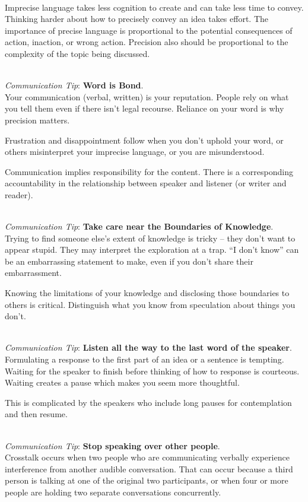 \ \\
Imprecise language takes less cognition to create and can take less time to convey. Thinking harder about how to precisely convey an idea takes effort. 
The importance of precise language is proportional to the potential consequences of action, inaction, or wrong action.
Precision also should be proportional to the complexity of the topic being discussed. 

\ \\
\textit{Communication Tip}: \textbf{Word is Bond\label{sec:word-is-bond}}.\\
Your communication (verbal, written) is your reputation. People rely on what you tell them even if there isn't legal recourse. Reliance on your word is why precision matters. 

Frustration and disappointment follow when you don't uphold your word, or others misinterpret your imprecise language, or you are misunderstood.

Communication implies responsibility for the content.  There is a corresponding accountability in the relationship between speaker and listener (or writer and reader).

\ \\
\textit{Communication Tip}: \textbf{Take care near the Boundaries of Knowledge}.\\
Trying to find someone else's extent of knowledge is tricky -- they don't want to appear stupid. They may interpret the exploration at a trap. ``I don't know'' can be an embarrassing statement to make, even if you don't share their embarrassment. 

Knowing the limitations of your knowledge and disclosing those boundaries to others is critical. Distinguish what you know from speculation about things you don't. 

\ \\
\textit{Communication Tip}: \textbf{Listen all the way to the last word of the speaker}.\\
Formulating a response to the first part of an idea or a sentence is tempting. Waiting for the speaker to finish before thinking of how to response is courteous. Waiting creates a pause which makes you seem more thoughtful. 

This is complicated by the speakers who include long pauses for contemplation and then resume. 

\ \\
\textit{Communication Tip}: \textbf{Stop speaking over other people\label{sec:crosstalk}}.\\
Crosstalk occurs when two people who are communicating verbally experience interference from another audible conversation. That can occur because a third person is talking at one of the original two participants, or when four or more people are holding two separate conversations concurrently. 

